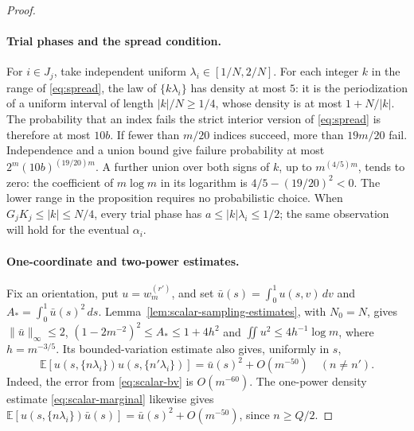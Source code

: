 \begin{proof}
\paragraph{Trial phases and the spread condition.}
For $i\in J_j$, take independent uniform $\lambda_i\in[1/N,2/N]$.
For each integer $k$ in the range of \eqref{eq:spread}, the law of
$\{k\lambda_i\}$ has density at most $5$: it is the periodization of
a uniform interval of length $|k|/N\ge1/4$, whose density is at most
$1+N/|k|$.  The probability that an index fails the strict interior
version of \eqref{eq:spread} is therefore at most $10b$.
If fewer than $m/20$ indices succeed, more than $19m/20$ fail.
Independence and a union bound give failure probability at most
$2^m(10b)^{(19/20)m}$.  A further union over both signs of $k$, up to
$m^{(4/5)m}$, tends to zero: the coefficient of $m\log m$ in its
logarithm is $4/5-(19/20)^2<0$.
The lower range in the proposition requires no probabilistic choice.
When $G_jK_j\le|k|\le N/4$, every trial phase has
$a\le|k|\lambda_i\le1/2$; the same observation will hold for the
eventual $\alpha_i$.

\paragraph{One-coordinate and two-power estimates.}
Fix an orientation, put $u=w_m^{(r')}$, and set
$\bar u(s)=\int_0^1u(s,v)\,dv$ and $A_*=\int_0^1\bar u(s)^2\,ds$.
Lemma~\ref{lem:scalar-sampling-estimates}, with $N_0=N$, gives
$\|\bar u\|_\infty\le2$,
$(1-2m^{-2})^2\le A_*\le1+4h^2$ and
$\iint u^2\le4h^{-1}\log m$, where $h=m^{-3/5}$.
Its bounded-variation estimate also gives, uniformly in $s$,
\begin{equation}\label{eq:two-power}
 \mathbb E[u(s,\{n\lambda_i\})u(s,\{n'\lambda_i\})]
       =\bar u(s)^2+O(m^{-50})\quad(n\ne n').
\end{equation}
Indeed, the error from \eqref{eq:scalar-bv} is $O(m^{-60})$.
The one-power density estimate \eqref{eq:scalar-marginal} likewise gives
$\mathbb E[u(s,\{n\lambda_i\})\bar u(s)]
=\bar u(s)^2+O(m^{-50})$, since $n\ge Q/2$.


\end{proof}
